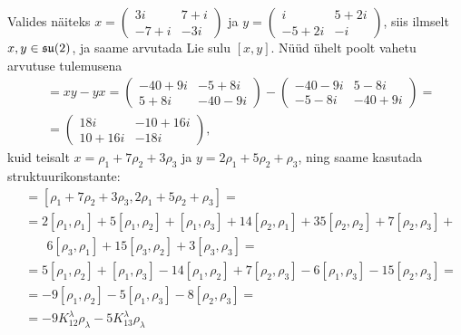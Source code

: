 \begin{naide}
    Valides näiteks
        $x = \begin{pmatrix}
              3i & 7+i \\
            -7+i & -3i
        \end{pmatrix}$
        ja
        $y = \begin{pmatrix}
            i & 5 + 2i \\
            -5+2i &     -i
        \end{pmatrix}$,
    siis ilmselt $x, y  \in \mathfrak{su}(2)$, ja saame arvutada Lie sulu $[x, y]$.
    Nüüd ühelt poolt vahetu arvutuse tulemusena
    \begin{align*}
        [x, y] &= xy - yx =
            \begin{pmatrix}
                -40+9i &  -5+8i \\
                  5+8i & -40-9i
            \end{pmatrix} - 
            \begin{pmatrix}
                -40-9i &   5-8i \\
                 -5-8i & -40+9i
            \end{pmatrix} = \\[0.1cm]
            &= \begin{pmatrix}
                   18i & -10+16i \\
                10+16i &    -18i
            \end{pmatrix},
    \end{align*}
    kuid teisalt $x = \rho_1 + 7\rho_2 + 3\rho_3$ ja
    $y = 2\rho_1 + 5\rho_2 + \rho_3$, ning saame kasutada
    struktuurikonstante:
    \begin{align*}
        [x, y] &= [\rho_1 + 7\rho_2 + 3\rho_3,
                  2\rho_1 + 5\rho_2 + \rho_3] = \\
        &= 2[\rho_1, \rho_1] + 5[\rho_1, \rho_2] + [\rho_1, \rho_3] +
            14[\rho_2, \rho_1] + 35[\rho_2, \rho_2] +
            7[\rho_2, \rho_3] + \\
        &\phantom{=}\, \ 6[\rho_3, \rho_1] + 15[\rho_3, \rho_2] +
            3[\rho_3, \rho_3] = \\
        &= 5[\rho_1, \rho_2] + [\rho_1, \rho_3] - 14[\rho_1, \rho_2] +
            7[\rho_2, \rho_3] - 6[\rho_1, \rho_3] -
            15[\rho_2, \rho_3] = \\
        &= -9[\rho_1, \rho_2] -5[\rho_1, \rho_3] -
            8[\rho_2, \rho_3] = \\
        &= -9 K_{12}^{\lambda} \rho_\lambda
           -5 K_{13}^{\lambda} \rho_\lambda

\end{align*}
\end{naide}
